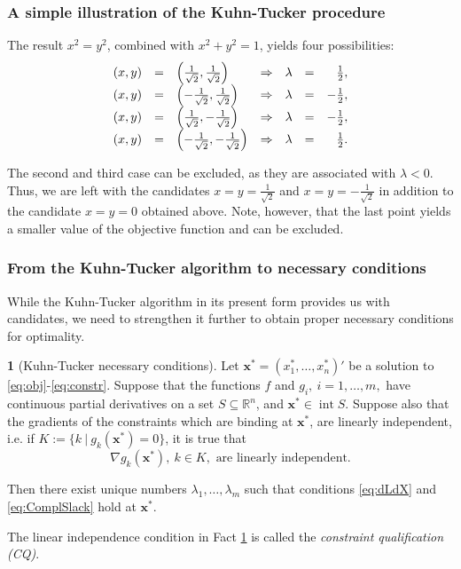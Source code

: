 \documentclass[10pt]{beamer}
\DeclareMathOperator*{\interior}{int}
\theoremstyle{definition}
\newtheorem{Fact}{\translate{Fact}}
\begin{document}
\begin{frame}[fragile]
\frametitle{A simple illustration of the Kuhn-Tucker procedure}\addtocounter{theorem}{-1}
\begin{example}[cont.]
The result $ x^2 = y^2 $, combined with $ x^2+y^2 = 1 $, yields four possibilities: \[ \begin{array}{l l l l l l r}
(x,y) & = & \left(\frac{1}{\sqrt{2}},\frac{1}{\sqrt{2}}\right) & \Rightarrow & \lambda &=& \frac{1}{2},\\
(x,y) & = & \left(-\frac{1}{\sqrt{2}},\frac{1}{\sqrt{2}}\right)& \Rightarrow &\lambda &=& -\frac{1}{2},\\
(x,y) & = & \left(\frac{1}{\sqrt{2}},-\frac{1}{\sqrt{2}}\right)& \Rightarrow &\lambda &=& -\frac{1}{2},\\
(x,y) & = & \left(-\frac{1}{\sqrt{2}},-\frac{1}{\sqrt{2}}\right)& \Rightarrow &\lambda &=& \frac{1}{2} .
\end{array} \]

The second and third case can be excluded, as they are associated with $ \lambda<0 $. Thus, we are left with the candidates $ x=y=\frac{1}{\sqrt{2}} $ and $ x=y=-\frac{1}{\sqrt{2}} $ in addition to the candidate $ x=y=0$ obtained above. Note, however, that the last point yields a smaller value of the objective function and can be excluded.
\end{example}
\end{frame}

\begin{frame}[fragile]
\frametitle{From the Kuhn-Tucker algorithm to necessary conditions}
While the Kuhn-Tucker algorithm in its present form provides us with candidates, we need to strengthen it further to obtain proper necessary conditions for optimality.\pause

\begin{Fact}[Kuhn-Tucker necessary conditions]
Let $ \mathbf{x^*}=(x_1^*,\ldots,x_n^*)' $ be a solution to \eqref{eq:obj}-\eqref{eq:constr}. Suppose that the functions $ f $ and $ g_i,~i=1,\ldots,m ,$ have continuous partial derivatives on a set $ S\subseteq \mathbb{R}^n $, and $ \mathbf{x^*} \in \interior S $. Suppose also that the gradients of the constraints which are binding at $ \mathbf{x^*} $, are linearly independent, i.e. if $ K := \{k~\vert~ g_k(\mathbf{x^*})=0\} $, it is true that \[ \nabla g_k(\mathbf{x^*}),~k\in K, \text{ are linearly independent.} \]

Then there exist unique numbers $ \lambda_1,\ldots,\lambda_m $ such that conditions \eqref{eq:dLdX} and \eqref{eq:ComplSlack} hold at $ \mathbf{x^*} $.
\label{fc:KT_NCs}
\end{Fact}\bigskip

The linear independence condition in Fact \ref{fc:KT_NCs} is called the \emph{constraint qualification (CQ)}.
\end{frame}
\end{document}
